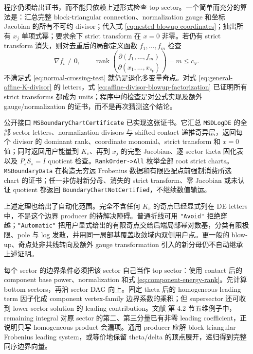 \documentclass[11pt,a4paper]{ctexart}
\begin{document}
程序仍须给出证书，而不能只依赖上述形式检查 top sector。一个简单而充分的算法是：汇总完整 block-triangular connection、normalization gauge 和坐标 Jacobian 的所有不可约 divisor；代入式 \eqref{eq:nested-blowup-coordinates}；抽出所有 $x_j$ 单项式幂；要求余下 strict transform 在 $x=0$ 非零。若仍有 strict transform 消失，则对去重后的局部定义函数 $f_1,\ldots,f_m$ 检查
\begin{equation}
 \nabla f_i\neq0,
 \qquad
 \operatorname{rank}\!\left(\frac{\partial(f_1,\ldots,f_m)}
 {\partial(x_1,\ldots,x_{c_V})}\right)=m\leq c_V.
 \label{eq:normal-crossing-test}
\end{equation}
不满足式 \eqref{eq:normal-crossing-test} 就仍是退化多变量奇点。对式 \eqref{eq:general-affine-K-divisor} 的 letters，式 \eqref{eq:affine-divisor-blowup-factorization} 已证明所有 strict transforms 都成为 units；程序中的检查是对公式实现及额外 gauge/normalization 的证书，而不是再次猜测这个结论。

公开接口 \texttt{MSBoundaryChartCertificate} 已实现这张证书。它汇总 \texttt{MSDLogDE} 的全部 sector letters、normalization divisors 与 shifted-contact 递推奇异层，返回每个 divisor 的 dominant rank、coordinate monomial、strict transform 和 $x=0$ 值；同时返回用户能量到 $K_v$、再到 $x_j$ 的完整 Jacobian、逐 sector theta 固化表以及 $P_sS_s=I$ quotient 检查。\texttt{RankOrder->All} 枚举全部 root strict charts。\texttt{MSBoundaryData} 在构造无穷远 Frobenius 数据和有限匹配点前强制消费所选 chart 的证书；任一非仿射新分母、消失的 strict transform、零 Jacobian 或未认证 quotient 都返回 \texttt{BoundaryChartNotCertified}，不继续数值输运。

上述定理也给出了自动化范围。完全不含任何 $K_v$ 的奇点已经显式列在 DE letters 中，不是这个边界 producer 的待解决障碍。普通折线可用 \texttt{"Avoid"} 拒绝穿越；\texttt{"Automatic"} 把用户显式给出的有限奇点交给后端局部幂对数基，分类有限极限、pole 与 log 发散，并用同一局部基覆盖收敛域内双侧用户点。更一般的 blow-up、奇点处非共线转向及额外 gauge transformation 引入的新分母仍不自动继承上述证明。

每个 sector 的边界条件必须把该 sector 自己当作 top sector：使用 contact 后的 component base power、normalization 和式 \eqref{eq:component-energy-rank}。先计算 bottom sectors，再沿 sector DAG 向上。固定 theta 后的 homogeneous leading term 因子化成 component vertex-family 边界系数的乘积；但 supersector 还可收到 lower-sector solution 的 leading contribution。文献 \cite{Chen:2024jms} 第 4.2 节五维例子中，remaining integral 对原 sector 的第二、第三分量已有非零 leading coefficient，正说明只写 homogeneous product 会漏项。通用 producer 应解 block-triangular Frobenius leading system，或等价地保留 theta/delta 的顶点展开，递归得到完整同序边界向量。
\end{document}
